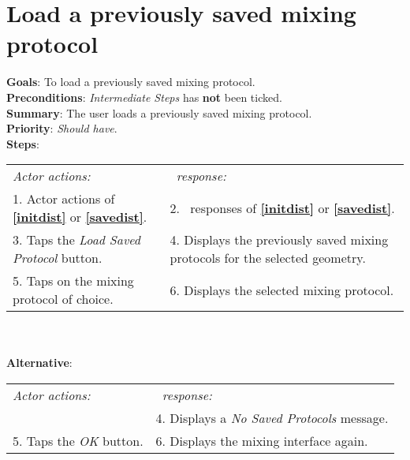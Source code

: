   \section{Load a previously saved mixing protocol}
  \label{loadsaveprot}
  \textbf{Goals}: To load a previously saved mixing protocol.\\
  \textbf{Preconditions}: \emph{Intermediate Steps} has \textbf{not} been ticked.\\
  \textbf{Summary}: The user loads a previously saved mixing protocol.\\
  \textbf{Priority}: \emph{Should have}.\\
  \textbf{Steps}: \\
  \begin{tabular}{ p{} p{} }
  	\emph{Actor actions:} & \emph{\projectname\ response:} \\
  	1. Actor actions of \textbf{\ref{initdist}} or  \textbf{\ref{savedist}}. & 2. \projectname\ responses of \textbf{\ref{initdist}} or  \textbf{\ref{savedist}}. \\
	3. Taps the \emph{Load Saved Protocol} button. & 4. Displays the previously saved mixing protocols for the selected geometry. \\
	5. Taps on the mixing protocol of choice. & 6. Displays the selected mixing protocol.\\
	\end{tabular}
	        \\
     \\\textbf{Alternative}: \\
    \begin{tabular}{ p{} p{} }
  	\emph{Actor actions:} & \emph{\projectname\ response:} \\
            & 4. Displays a \emph{No Saved Protocols} message. \\
    5. Taps the \emph{OK} button. & 6. Displays the mixing interface again. \\
  \end{tabular}
  
